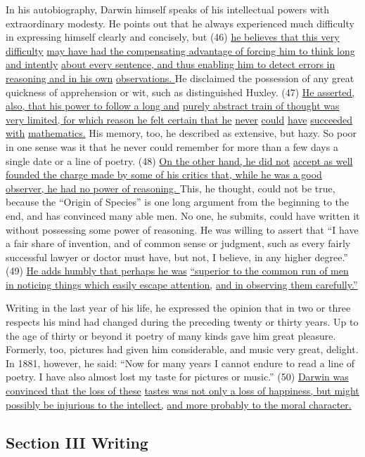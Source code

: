 \documentclass[UTF8,11pt]{ctexart}
\begin{document}
In his autobiography, Darwin himself speaks of his intellectual powers with extraordinary modesty. He points out that he always experienced much difficulty in expressing himself clearly and concisely, but (46) \uline{he believes that this very difficulty} \uline{may have had the compensating advantage of forcing him to think long and intently} \uline{about every sentence, and thus enabling him to detect errors in reasoning and in his own} \uline{observations. }He disclaimed the possession of any great quickness of apprehension or wit, such as distinguished Huxley. (47) \uline{He asserted, also, that his power to follow a long and} \uline{purely abstract train of thought was very limited, for which reason he felt certain that he} \uline{never} \uline{could} \uline{have} \uline{succeeded} \uline{with} \uline{mathematics.} His memory, too, he described as extensive, but hazy. So poor in one sense was it that he never could remember for more than a few days a single date or a line of poetry. (48) \uline{On the other hand, he did not} \uline{accept as well founded the charge made by some of his critics that, while he was a good} \uline{observer, he had no power of reasoning. }This, he thought, could not be true, because the “Origin of Species” is one long argument from the beginning to the end, and has convinced many able men. No one, he submits, could have written it without possessing some power of reasoning. He was willing to assert that “I have a fair share of invention, and of common sense or judgment, such as every fairly successful lawyer or doctor must have, but not, I believe, in any higher degree.” (49) \uline{He adds humbly that perhaps he was} \uline{“superior to the common run of men in noticing things which easily escape attention,} \uline{and in observing them carefully.”}


Writing in the last year of his life, he expressed the opinion that in two or three respects his mind had changed during the preceding twenty or thirty years. Up to the age of thirty or beyond it poetry of many kinds gave him great pleasure. Formerly, too, pictures had given him considerable, and music very great, delight. In 1881, however, he said: “Now for many years I cannot endure to read a line of poetry. I have also almost lost my taste for pictures or music.” (50) \uline{Darwin was convinced that the loss of these} \uline{tastes was not only a loss of happiness, but might possibly be injurious to the intellect,} \uline{and more probably to the moral character.}


\subsection*{\textbf{Section III Writing}}
\end{document}
